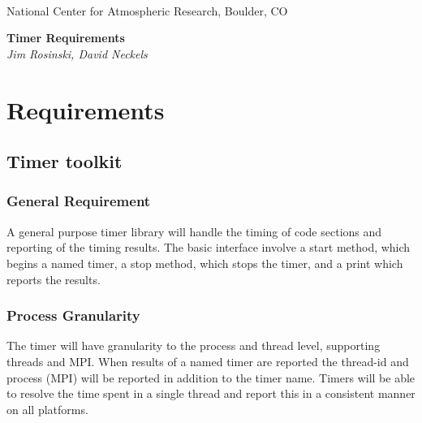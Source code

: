 \documentclass[]{article}
\begin{document}

\begin{titlepage}

\begin{latexonly}
 \\
\noindent National Center for Atmospheric Research, Boulder, CO \\
\vspace{2in}
\end{latexonly}

\begin{center}
{\Large\bf Timer Requirements} \\
\medskip
{\it Jim Rosinski, David Neckels }
\end{center}

\end{titlepage}

\tableofcontents

\newpage


\section{Requirements}

\subsection{Timer toolkit}

\subsubsection{General Requirement}
A general purpose timer library will handle the timing of
code sections and reporting of the timing results.  The basic interface involve
a start method, which begins a named timer, a stop method, which stops the
timer, and a print which reports the results.

\subsubsection{Process Granularity}

The timer will have granularity to the process and thread level, supporting 
threads and MPI.  When results of a named timer are reported the
thread-id and process (MPI) will be reported in addition to the timer name.
Timers will be able to resolve the time spent in a single
thread and report this in a consistent manner on all platforms.
\end{document}
